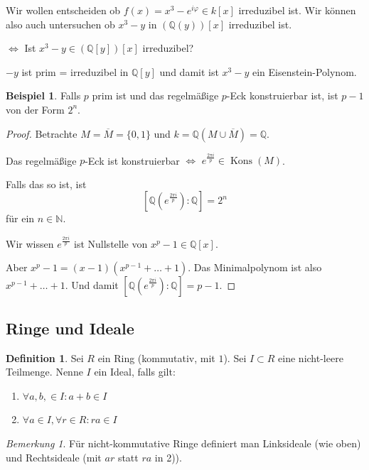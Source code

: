 \documentclass[12pt,parskip=full]{scrartcl}
\newcommand{\setN}{\mathbb{N}}
\newcommand{\setQ}{\mathbb{Q}}
\theoremstyle{definition}
\newtheorem{definition}[theorem]{Definition}
\newtheorem{example}[theorem]{Beispiel}
\theoremstyle{remark}
\newtheorem*{remark}{Bemerkung}
\begin{document}
	Wir wollen entscheiden ob $f(x) = x^3 - e^{i \varphi} \in k[x]$ irreduzibel ist. Wir können also auch untersuchen ob $x^3 - y$ in $(\setQ(y))[x]$ irreduzibel ist.
	
	$\Leftrightarrow$ Ist $x^3 - y \in (\setQ[y])[x]$ irreduzibel?
	
	$-y$ ist prim = irreduzibel in $\setQ[y]$ und damit ist $x^3 - y$ ein Eisenstein-Polynom.
	
	\begin{example}
		Falls $p$ prim ist und das regelmäßige $p$-Eck konstruierbar ist, ist $p - 1$ von der Form $2^n$.
	\end{example}

	\begin{proof}
		Betrachte $M = \overline{M} = \{ 0, 1 \}$ und $k = \setQ(M \cup \overline{M}) = \setQ$.
		
		Das regelmäßige $p$-Eck ist konstruierbar $\Leftrightarrow$ $e^{\frac{2 \pi i}{p}} \in \operatorname{Kons}(M)$.
		
		Falls das so ist, ist
		\begin{equation*}
			\left[ \setQ(e^{\frac{2 \pi i}{p}}) : \setQ \right] = 2^n
		\end{equation*}
		für ein $n \in \setN$.
		
		Wir wissen $e^{\frac{2 \pi i}{p}}$ ist Nullstelle von $x^p - 1 \in \setQ[x]$.
		
		Aber $x^p - 1 = (x-1)(x^{p-1} + \dots + 1)$. Das Minimalpolynom ist also $x^{p-1} + \dots + 1$. Und damit $\left[ \setQ(e^{\frac{2 \pi i}{p}}) : \setQ \right] = p - 1$.
	\end{proof}

	\subsection{Ringe und Ideale}
	
	\begin{definition}
		Sei $R$ ein Ring (kommutativ, mit $1$). Sei $I \subset R$ eine nicht-leere Teilmenge. Nenne $I$ ein Ideal, falls gilt:
		\begin{enumerate}
			\item $\forall a,b, \in I: a + b \in I$
			\item $\forall a \in I, \forall r \in R: r a \in I$
		\end{enumerate}
	\end{definition}

	\begin{remark}
		Für nicht-kommutative Ringe definiert man Linksideale (wie oben) und Rechtsideale (mit $ar$ statt $ra$ in 2)).
	\end{remark}
\end{document}
